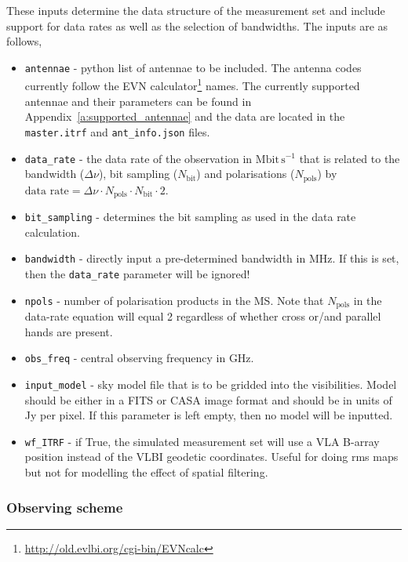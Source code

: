 \documentclass[11pt]{report_jfr}
\newcommand{\deff}{\fontfamily{lmss}\selectfont}
\begin{document}
These inputs determine the data structure of the measurement set and include support for data rates as well as the selection of bandwidths. The inputs are as follows,
%
\begin{itemize}
	\item \texttt{antennae} - python list of antennae to be included. The antenna codes currently follow the EVN calculator\footnote{\deff \href{http://old.evlbi.org/cgi-bin/EVNcalc}{http://old.evlbi.org/cgi-bin/EVNcalc}} names. The currently supported antennae and their parameters can be found in Appendix~\ref{a:supported_antennae} and the data are located in the \texttt{master.itrf} and \texttt{ant\_info.json} files. 
	\item \texttt{data\_rate} - the data rate of the observation in $\mathrm{Mbit\,s^{-1}}$ that is related to the bandwidth ($\Delta\nu$), bit sampling ($N_\mathrm{bit}$) and polarisations ($N_\mathrm{pols}$) by $\text{data rate} = \Delta\nu \cdot N_\mathrm{pols} \cdot N_\mathrm{bit}\cdot 2$. 
	\item \texttt{bit\_sampling} - determines the bit sampling as used in the data rate calculation.
	\item \texttt{bandwidth} - directly input a pre-determined bandwidth in MHz. If this is set, then the \texttt{data\_rate} parameter will be ignored!
	\item \texttt{npols} - number of polarisation products in the MS. Note that $N_\mathrm{pols}$ in the data-rate equation will equal 2 regardless of whether cross or/and parallel hands are present.
	\item \texttt{obs\_freq} - central observing frequency in GHz.
	\item \texttt{input\_model} - sky model file that is to be gridded into the visibilities. Model should be either in a FITS or CASA image format and should be in units of Jy per pixel. If this parameter is left empty, then no model will be inputted.
	\item \texttt{wf\_ITRF} - if True, the simulated measurement set will use a VLA B-array position instead of the VLBI geodetic coordinates. Useful for doing rms maps but not for modelling the effect of spatial filtering.
\end{itemize}

\subsubsection{Observing scheme}
\end{document}
